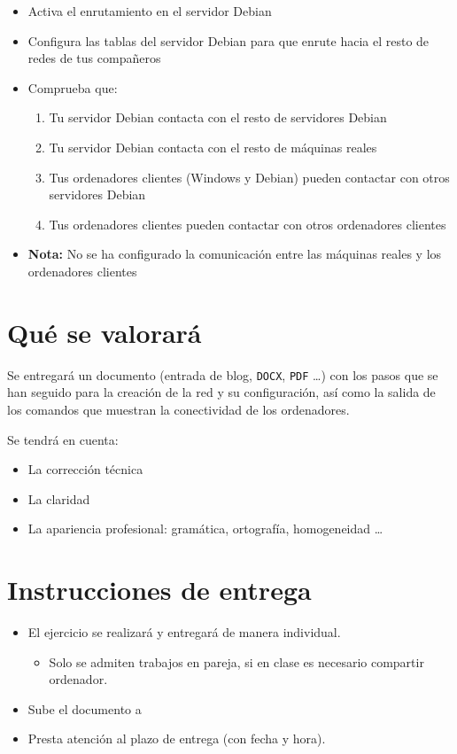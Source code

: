 \begin{itemize}
\item Activa el enrutamiento en el servidor Debian
\item Configura las tablas del servidor Debian para que enrute hacia el resto de redes de tus compañeros
\item Comprueba que:
  \begin{enumerate}
  \item Tu servidor Debian contacta con el resto de servidores Debian
  \item Tu servidor Debian contacta con el resto de máquinas reales
  \item Tus ordenadores clientes (Windows y Debian) pueden contactar con otros servidores Debian
  \item Tus ordenadores clientes pueden contactar con otros ordenadores clientes
  \end{enumerate}
\item \textbf{Nota:} No se ha configurado la comunicación entre las máquinas reales y los ordenadores clientes
\end{itemize}

\section{Qué se valorará}
Se entregará un documento (entrada de blog, \texttt{DOCX}, \texttt{PDF} \ldots) con los pasos que se han seguido para la creación de la red y su configuración, así como la salida de los comandos que muestran la conectividad de los ordenadores.

Se tendrá en cuenta:
\begin{itemize}
\item La corrección técnica
\item La claridad
\item La apariencia profesional: gramática, ortografía, homogeneidad \ldots
\end{itemize}


\section{Instrucciones de entrega}
\begin{itemize}
\item El ejercicio se realizará y entregará de manera
  individual.
  \begin{itemize}
  \item Solo se admiten trabajos en pareja, si en clase es necesario compartir ordenador.
  \end{itemize}
\item Sube el documento a 
\item Presta atención al plazo de entrega (con fecha y hora).
\end{itemize}








